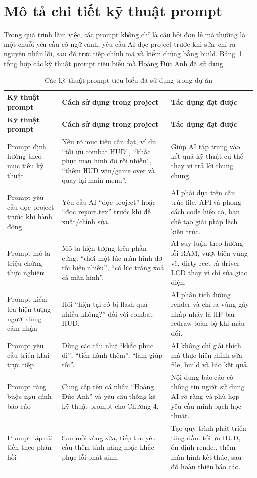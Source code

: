 \documentclass[a4paper,12pt]{report}
\begin{document}
\section{Mô tả chi tiết kỹ thuật prompt}

Trong quá trình làm việc, các prompt không chỉ là câu hỏi đơn lẻ mà thường là một chuỗi yêu cầu có ngữ cảnh, yêu cầu AI đọc project trước khi sửa, chỉ ra nguyên nhân lỗi, sau đó trực tiếp chỉnh mã và kiểm chứng bằng build. Bảng~\ref{tab:prompt-techniques} tổng hợp các kỹ thuật prompt tiêu biểu mà Hoàng Đức Anh đã sử dụng.

\begin{longtable}{p{3.2cm} p{5.2cm} p{5.2cm}}
\caption{Các kỹ thuật prompt tiêu biểu đã sử dụng trong dự án}
\label{tab:prompt-techniques}\\
\toprule
\textbf{Kỹ thuật prompt} & \textbf{Cách sử dụng trong project} & \textbf{Tác dụng đạt được} \\
\midrule
\endfirsthead
\toprule
\textbf{Kỹ thuật prompt} & \textbf{Cách sử dụng trong project} & \textbf{Tác dụng đạt được} \\
\midrule
\endhead
Prompt định hướng theo mục tiêu kỹ thuật & Nêu rõ mục tiêu cần đạt, ví dụ ``tối ưu combat HUD'', ``khắc phục màn hình đơ rồi nhiễu'', ``thêm HUD win/game over và quay lại main menu''. & Giúp AI tập trung vào kết quả kỹ thuật cụ thể thay vì trả lời chung chung. \\
\midrule
Prompt yêu cầu đọc project trước khi hành động & Yêu cầu AI ``đọc project'' hoặc ``đọc report.tex'' trước khi đề xuất/chỉnh sửa. & AI phải dựa trên cấu trúc file, API và phong cách code hiện có, hạn chế tạo giải pháp lệch kiến trúc. \\
\midrule
Prompt mô tả triệu chứng thực nghiệm & Mô tả hiện tượng trên phần cứng: ``chơi một lúc màn hình đơ rồi hiện nhiễu'', ``có lúc trắng xoá cả màn hình''. & AI suy luận theo hướng lỗi RAM, vượt biên vùng vẽ, dirty-rect và driver LCD thay vì chỉ sửa giao diện. \\
\midrule
Prompt kiểm tra hiện tượng người dùng cảm nhận & Hỏi ``hiện tại có bị flash quá nhiều không?'' đối với combat HUD. & AI phân tích đường render và chỉ ra vùng gây nhấp nháy là HP bar redraw toàn bộ khi máu đổi. \\
\midrule
Prompt yêu cầu triển khai trực tiếp & Dùng các câu như ``khắc phục đi'', ``tiến hành thêm'', ``làm giúp tôi''. & AI không chỉ giải thích mà thực hiện chỉnh sửa file, build và báo kết quả. \\
\midrule
Prompt ràng buộc ngữ cảnh báo cáo & Cung cấp tên cá nhân ``Hoàng Đức Anh'' và yêu cầu thống kê kỹ thuật prompt cho Chương 4. & Nội dung báo cáo có thông tin người sử dụng AI rõ ràng và phù hợp yêu cầu minh bạch học thuật. \\
\midrule
Prompt lặp cải tiến theo phản hồi & Sau mỗi vòng sửa, tiếp tục yêu cầu thêm tính năng hoặc khắc phục lỗi phát sinh. & Tạo quy trình phát triển tăng dần: tối ưu HUD, ổn định render, thêm màn hình kết thúc, sau đó hoàn thiện báo cáo. \\
\bottomrule
\end{longtable}
\end{document}
